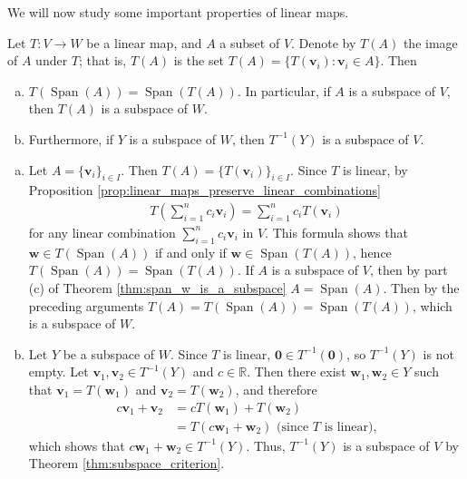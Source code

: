 \documentclass[12pt,letterpaper,reqno]{article}
\numberwithin{equation}{section}
\newcommand{\R}{\ensuremath{\mathbb R}}
\DeclareMathOperator{\Span}{Span}
\begin{document}
We will now study some important properties of linear maps.

\begin{thm}\label{thm:linear_maps_preserve_subspaces}
	Let $T:V \to W$ be a linear map, and $A$ a subset of $V$. Denote by $T(A)$ the image of $A$ under $T$; that is, $T(A)$ is the set $T(A)=\{T(\mathbf{v}_i):\mathbf{v}_i \in A\}$. Then
	\begin{enumerate}[(a)]
		\item $T(\Span(A))=\Span(T(A))$. In particular, if $A$ is a subspace of $V$, then $T(A)$ is a subspace of $W$.
		\item Furthermore, if $Y$ is a subspace of $W$, then $T^{-1}(Y)$ is a subspace of $V$.
	\end{enumerate}
\end{thm}

\begin{pf}
\begin{enumerate}[(a)]
	\item Let $A=\{\mathbf{v}_i\}_{i \in I}$. Then $T(A)=\{T(\mathbf{v}_i)\}_{i \in I}.$ Since $T$ is linear, by Proposition \ref{prop:linear_maps_preserve_linear_combinations}
	\begin{align*}
		T\left(\sum_{i=1}^nc_i\mathbf{v}_i\right)=\sum_{i=1}^nc_iT(\mathbf{v}_i)
	\end{align*}
	for any linear combination $\sum_{i=1}^nc_i\mathbf{v}_i$ in $V$. This formula shows that $\mathbf{w} \in T(\Span(A))$ if and only if $\mathbf{w} \in \Span(T(A))$, hence $T(\Span(A))=\Span(T(A))$. If $A$ is a subspace of $V$, then by part (c) of Theorem \ref{thm:span_w_is_a_subspace} $A=\Span(A)$. Then by the preceding arguments $T(A)=T(\Span(A))=\Span(T(A))$, which is a subspace of $W$.
	\item Let $Y$ be a subspace of $W$. Since $T$ is linear, $\mathbf{0} \in T^{-1}(\mathbf{0})$, so $T^{-1}(Y)$ is not empty. Let $\mathbf{v}_1, \mathbf{v}_2 \in T^{-1}(Y)$ and $c \in \R$. Then there exist $\mathbf{w}_1, \mathbf{w}_2 \in Y$ such that $\mathbf{v}_1=T(\mathbf{w}_1)$ and $\mathbf{v}_2=T(\mathbf{w}_2)$, and therefore
	\begin{align*}
		c\mathbf{v}_1+\mathbf{v}_2&=cT(\mathbf{w}_1)+T(\mathbf{w}_2) \\
		&=T(c\mathbf{w}_1+\mathbf{w}_2) \text{ (since $T$ is linear),}
	\end{align*}
	which shows that $c\mathbf{w}_1+\mathbf{w}_2 \in T^{-1}(Y)$. Thus, $T^{-1}(Y)$ is a subspace of $V$ by Theorem \ref{thm:subspace_criterion}.
\end{enumerate}	
\end{pf}
\end{document}

